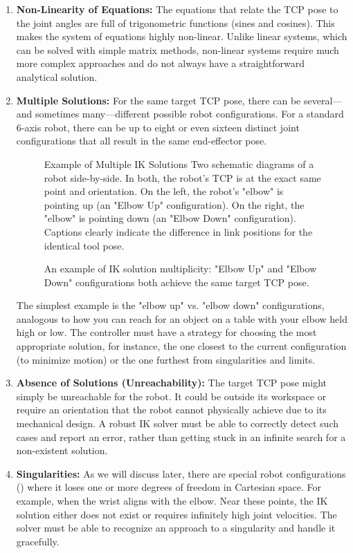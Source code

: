 \begin{enumerate}
    \item \textbf{Non-Linearity of Equations:} The equations that relate the TCP pose to the joint angles are full of trigonometric functions (sines and cosines). This makes the system of equations highly non-linear. Unlike linear systems, which can be solved with simple matrix methods, non-linear systems require much more complex approaches and do not always have a straightforward analytical solution.

    \item \textbf{Multiple Solutions:} For the same target TCP pose, there can be several—and sometimes many—different possible robot configurations. For a standard 6-axis robot, there can be up to eight or even sixteen distinct joint configurations that all result in the same end-effector pose.
    
    \begin{figure}[h!]
        \centering
        \begin{infobox}{Example of Multiple IK Solutions}
            Two schematic diagrams of a robot side-by-side. In both, the robot's TCP is at the exact same point and orientation. On the left, the robot's "elbow" is pointing up (an "Elbow Up" configuration). On the right, the "elbow" is pointing down (an "Elbow Down" configuration). Captions clearly indicate the difference in link positions for the identical tool pose.
        \end{infobox}
        \caption{An example of IK solution multiplicity: "Elbow Up" and "Elbow Down" configurations both achieve the same target TCP pose.}
        \label{fig:ik_multiplicity}
    \end{figure}
    
    The simplest example is the "elbow up" vs. "elbow down" configurations, analogous to how you can reach for an object on a table with your elbow held high or low. The controller must have a strategy for choosing the most appropriate solution, for instance, the one closest to the current configuration (to minimize motion) or the one furthest from singularities and limits.

    \item \textbf{Absence of Solutions (Unreachability):} The target TCP pose might simply be unreachable for the robot. It could be outside its workspace or require an orientation that the robot cannot physically achieve due to its mechanical design. A robust IK solver must be able to correctly detect such cases and report an error, rather than getting stuck in an infinite search for a non-existent solution.

    \item \textbf{Singularities:} As we will discuss later, there are special robot configurations () where it loses one or more degrees of freedom in Cartesian space. For example, when the wrist aligns with the elbow. Near these points, the IK solution either does not exist or requires infinitely high joint velocities. The solver must be able to recognize an approach to a singularity and handle it gracefully.
\end{enumerate}


